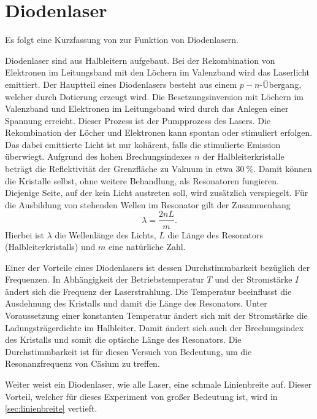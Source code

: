 \documentclass[../bericht.tex]{subfiles}
\begin{document}
    \section{Diodenlaser}
    \label{sec:diodenlaser}

      Es folgt eine Kurzfassung von \cite{quant} zur Funktion von Diodenlasern.

      Diodenlaser sind aus Halbleitern aufgebaut. Bei der Rekombination von Elektronen im Leitungsband mit den L\"ochern im Valenzband wird das Laserlicht emittiert. Der Hauptteil eines Diodenlasers besteht aus einem $p-n$-\"Ubergang, welcher durch Dotierung erzeugt wird. Die Besetzungsinversion mit L\"ochern im Valenzband und Elektronen im Leitungsband wird durch das Anlegen einer Spannung erreicht. Dieser Prozess ist der Pumpprozess des Lasers. Die Rekombination der L\"ocher und Elektronen kann spontan oder stimuliert erfolgen. Das dabei emittierte Licht ist nur koh\"arent, falls die stimulierte Emission \"uberwiegt. Aufgrund des hohen Brechungsindexes $n$ der Halbleiterkristalle betr\"agt die Reflektivit\"at der Grenzfl\"ache zu Vakuum in etwa $\SI{30}{\percent}$. Damit k\"onnen die Kristalle selbst, ohne weitere Behandlung, als Resonatoren fungieren. Diejenige Seite, auf der kein Licht austreten soll, wird zus\"atzlich verspiegelt. F\"ur die Ausbildung von stehenden Wellen im Resonator gilt der Zusammenhang
      \begin{equation*}
        \lambda = \frac{2nL}{m}.
      \end{equation*}
      Hierbei ist $\lambda$ die Wellenl\"ange des Lichts, $L$ die L\"ange des Resonators (Halbleiterkristalls) und $m$ eine nat\"urliche Zahl.

      Einer der Vorteile eines Diodenlasers ist dessen Durchstimmbarkeit bez\"uglich der Frequenzen. In Abh\"angigkeit der Betriebstemperatur $T$ und der Stromst\"arke $I$ \"andert sich die Frequenz der Laserstrahlung. Die Temperatur beeinflusst die Ausdehnung des Kristalls und damit die L\"ange des Resonators. Unter Voraussetzung einer konstanten Temperatur \"andert sich mit der Stromst\"arke die Ladungstr\"agerdichte im Halbleiter. Damit \"andert sich auch der Brechungsindex des Kristalls und somit die optische L\"ange des Resonators.
      Die Durchstimmbarkeit ist f\"ur diesen Versuch von Bedeutung, um die Resonanzfrequenz von C\"asium zu treffen.
      \medskip

      Weiter weist ein Diodenlaser, wie alle Laser, eine schmale Linienbreite auf. Dieser Vorteil, welcher f\"ur dieses Experiment von gro\ss{}er Bedeutung ist, wird in \cref{sec:linienbreite} vertieft.
\end{document}
